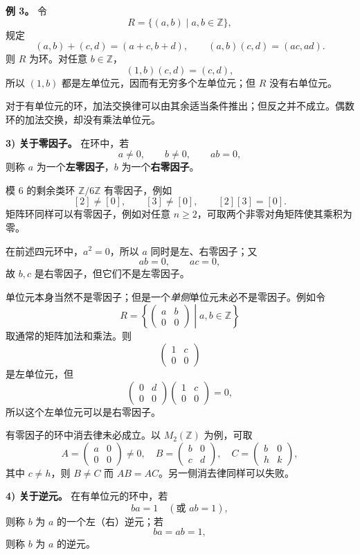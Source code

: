 \textbf{例 3。} 令
\[
R=\{(a,b)\mid a,b\in\mathbb Z\},
\]
规定
\[
(a,b)+(c,d)=(a+c,b+d),
\qquad
(a,b)(c,d)=(ac,ad).
\]
则 $R$ 为环。对任意 $b\in\mathbb Z$，
\[
(1,b)(c,d)=(c,d),
\]
所以 $(1,b)$ 都是左单位元，因而有无穷多个左单位元；但 $R$ 没有右单位元。

对于有单位元的环，加法交换律可以由其余适当条件推出；但反之并不成立。偶数环的加法交换，却没有乘法单位元。

\textbf{3) 关于零因子。} 在环中，若
\[
a\ne0,\qquad b\ne0,\qquad ab=0,
\]
则称 $a$ 为一个\textbf{左零因子}，$b$ 为一个\textbf{右零因子}。

模 $6$ 的剩余类环 $\mathbb Z/6\mathbb Z$ 有零因子，例如
\[
[2]\ne[0],\qquad[3]\ne[0],\qquad [2][3]=[0].
\]
矩阵环同样可以有零因子，例如对任意 $n\ge2$，可取两个非零对角矩阵使其乘积为零。

在前述四元环中，$a^2=0$，所以 $a$ 同时是左、右零因子；又
\[
ab=0,\qquad ac=0,
\]
故 $b,c$ 是右零因子，但它们不是左零因子。

单位元本身当然不是零因子；但是一个\emph{单侧}单位元未必不是零因子。例如令
\[
R=\left\{
\begin{pmatrix}a&b\\0&0\end{pmatrix}
\middle|a,b\in\mathbb Z
\right\}
\]
取通常的矩阵加法和乘法。则
\[
\begin{pmatrix}1&c\\0&0\end{pmatrix}
\]
是左单位元，但
\[
\begin{pmatrix}0&d\\0&0\end{pmatrix}
\begin{pmatrix}1&c\\0&0\end{pmatrix}=0,
\]
所以这个左单位元可以是右零因子。

有零因子的环中消去律未必成立。以 $M_2(\mathbb Z)$ 为例，可取
\[
A=\begin{pmatrix}a&0\\0&0\end{pmatrix}\ne0,
\quad
B=\begin{pmatrix}b&0\\c&d\end{pmatrix},
\quad
C=\begin{pmatrix}b&0\\h&k\end{pmatrix},
\]
其中 $c\ne h$，则 $B\ne C$ 而 $AB=AC$。另一侧消去律同样可以失败。

\textbf{4) 关于逆元。} 在有单位元的环中，若
\[
ba=1\quad(\text{或 }ab=1),
\]
则称 $b$ 为 $a$ 的一个左（右）逆元；若
\[
ba=ab=1,
\]
则称 $b$ 为 $a$ 的逆元。

